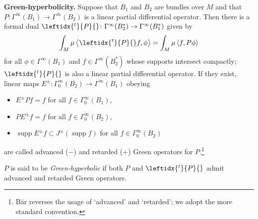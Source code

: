 \documentclass[11pt]{article}
\numberwithin{equation}{section}
\numberwithin{equation}{section}
\newcommand{\GoinX}[1]{\Gamma_0^\infty({#1})}
\DeclareMathOperator{\supp}{supp}
\newcommand{\adj}[1]{\leftidx{^{t}}{#1}{}}
\begin{document}
{\bf Green-hyperbolicity.} Suppose that $B_1$ and $B_2$ are bundles over $M$ and that $P\colon \Gamma^\infty(B_1)\to \Gamma^\infty(B_2)$ is a linear partial differential operator. Then there is a formal dual $\adj{P}\colon \Gamma^\infty(B_2^*)\to \Gamma^\infty(B_1^*)$ given by
 \begin{equation*}
 	\int_M \mu\, \big\langle \adj{P}f, \phi\big\rangle = \int_M\mu\, \langle f, P\phi\rangle
 \end{equation*}
 for all $\phi\in \Gamma^\infty(B_1)$ and $f\in \Gamma^\infty(B_2^*)$ whose supports intersect compactly; $\adj{P}$ is also a linear partial differential operator.
 If they exist, linear maps $E^\pm\colon \GoinX{B_2}\to \Gamma^\infty(B_1)$ obeying
 \begin{itemize}\itemsep=0pt
 	\item[(G1)] $E^\pm P f=f$ for all $f\in\GoinX{B_1}$,
 	\item[(G2)] $P E^\pm f = f$ for all $f\in\GoinX{B_2}$,
 	\item[(G3)] $\supp E^\pm f \subset J^\pm (\supp f)$ for all $f\in\GoinX{B_2}$
 \end{itemize}
 are called advanced ($-$) and retarded ($+$) Green operators for $P$.\footnote{B\"ar reverses the usage of `advanced' and `retarded'; we adopt the more standard convention.}
 \begin{Definition}
 	$P$ is said to be \emph{Green-hyperbolic} if both $P$ and $\adj{P}$ admit advanced and retarded Green operators.
 \end{Definition}
\end{document}
